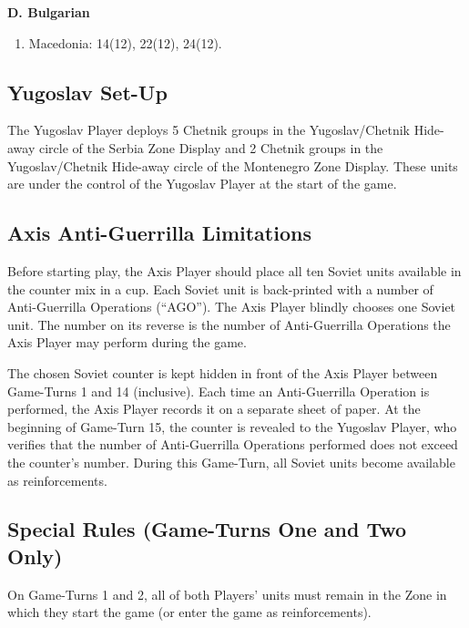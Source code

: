 \textbf{D. Bulgarian}
  \begin{enumerate}[leftmargin=1.7em,labelsep=0.45em]
    \item Macedonia: 14(12), 22(12), 24(12).
  \end{enumerate}

\subsection{Yugoslav Set-Up}\label{sec:15.2}

The Yugoslav Player deploys 5 Chetnik groups in the Yugoslav/Chetnik Hide-away
circle of the Serbia Zone Display and 2 Chetnik groups in the
Yugoslav/Chetnik Hide-away circle of the Montenegro Zone Display. These units
are under the control of the Yugoslav Player at the start of the game.

\subsection{Axis Anti-Guerrilla Limitations}\label{sec:15.3}

 Before starting play, the Axis Player should place all ten Soviet
units available in the counter mix in a cup. Each Soviet unit is back-printed
with a number of Anti-Guerrilla Operations (``AGO''). The Axis Player blindly
chooses one Soviet unit. The number on its reverse is the number of
Anti-Guerrilla Operations the Axis Player may perform during the game.

 The chosen Soviet counter is kept hidden in front of the Axis
Player between Game-Turns 1 and 14 (inclusive). Each time an Anti-Guerrilla
Operation is performed, the Axis Player records it on a separate sheet of
paper. At the beginning of Game-Turn 15, the counter is revealed to the
Yugoslav Player, who verifies that the number of Anti-Guerrilla Operations
performed does not exceed the counter's number. During this Game-Turn, all
Soviet units become available as reinforcements.

\subsection{Special Rules (Game-Turns One and Two Only)}\label{sec:15.4}

On Game-Turns 1 and 2, all of both Players' units must remain in the Zone in
which they start the game (or enter the game as reinforcements).

